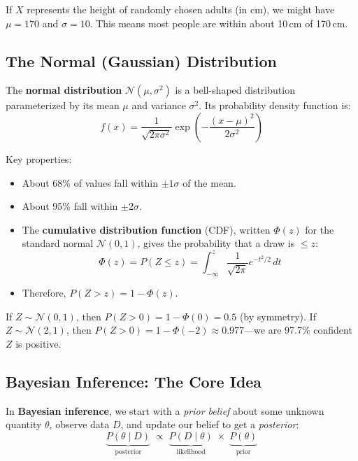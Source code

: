 \documentclass[11pt,letterpaper]{article}
\theoremstyle{definition}
\begin{document}
\begin{tcolorbox}[exbox]
If $X$ represents the height of randomly chosen adults (in cm), we might have $\mu = 170$ and $\sigma = 10$. This means most people are within about 10\,cm of 170\,cm.
\end{tcolorbox}

\subsection{The Normal (Gaussian) Distribution}

The \textbf{normal distribution} $\mathcal{N}(\mu, \sigma^2)$ is a bell-shaped distribution parameterized by its mean $\mu$ and variance $\sigma^2$. Its probability density function is:
\[
f(x) = \frac{1}{\sqrt{2\pi\sigma^2}} \exp\!\left(-\frac{(x - \mu)^2}{2\sigma^2}\right)
\]

Key properties:
\begin{itemize}[nosep]
  \item About 68\% of values fall within $\pm 1\sigma$ of the mean.
  \item About 95\% fall within $\pm 2\sigma$.
  \item The \textbf{cumulative distribution function} (CDF), written $\Phi(z)$ for the standard normal $\mathcal{N}(0,1)$, gives the probability that a draw is $\leq z$:
  \[
  \Phi(z) = P(Z \leq z) = \int_{-\infty}^{z} \frac{1}{\sqrt{2\pi}} e^{-t^2/2}\, dt
  \]
  \item Therefore, $P(Z > z) = 1 - \Phi(z)$.
\end{itemize}

\begin{tcolorbox}[exbox]
If $Z \sim \mathcal{N}(0,1)$, then $P(Z > 0) = 1 - \Phi(0) = 0.5$ (by symmetry). If $Z \sim \mathcal{N}(2, 1)$, then $P(Z > 0) = 1 - \Phi(-2) \approx 0.977$---we are 97.7\% confident $Z$ is positive.
\end{tcolorbox}

\subsection{Bayesian Inference: The Core Idea}

In \textbf{Bayesian inference}, we start with a \emph{prior belief} about some unknown quantity $\theta$, observe data $D$, and update our belief to get a \emph{posterior}:
\[
\underbrace{P(\theta \mid D)}_{\text{posterior}} \;\propto\; \underbrace{P(D \mid \theta)}_{\text{likelihood}} \;\times\; \underbrace{P(\theta)}_{\text{prior}}
\]
\end{document}
